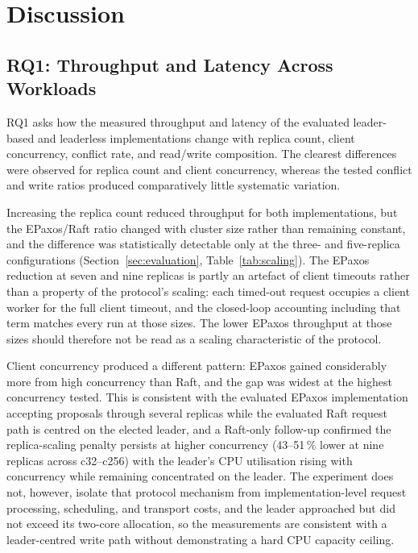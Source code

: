 \section{Discussion}

\label{sec:discussion}

\subsection{RQ1: Throughput and Latency Across Workloads}

RQ1 asks how the measured throughput and latency of the evaluated
leader-based and leaderless implementations change with replica count,
client concurrency, conflict rate, and read/write composition. The clearest
differences were observed for replica count and client concurrency, whereas
the tested conflict and write ratios produced comparatively little systematic
variation.

Increasing the replica count reduced throughput for both implementations,
but the EPaxos/Raft ratio changed with cluster size rather than remaining
constant, and the difference was statistically detectable only at the three-
and five-replica configurations (Section~\ref{sec:evaluation},
Table~\ref{tab:scaling}). The EPaxos reduction at seven and nine replicas
is partly an artefact of client timeouts rather than a property of the
protocol's scaling: each timed-out request occupies a client worker for the
full client timeout, and the closed-loop accounting including that term
matches every run at those sizes. The lower EPaxos throughput at those
sizes should therefore not be read as a scaling characteristic of the
protocol.

Client concurrency produced a different pattern: EPaxos gained considerably
more from high concurrency than Raft, and the gap was widest at the highest
concurrency tested. This is consistent with the evaluated EPaxos
implementation accepting proposals through several replicas while the
evaluated Raft request path is centred on the elected leader, and a
Raft-only follow-up confirmed the replica-scaling penalty persists at
higher concurrency (43--51\,\% lower at nine replicas across c32--c256)
with the leader's CPU utilisation rising with concurrency while remaining
concentrated on the leader. The experiment does not, however, isolate that
protocol mechanism from implementation-level request processing,
scheduling, and transport costs, and the leader approached but did not
exceed its two-core allocation, so the measurements are consistent with a
leader-centred write path without demonstrating a hard CPU capacity
ceiling.

